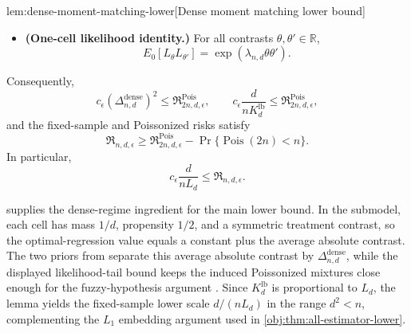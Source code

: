 \begin{lemmav}{lem:dense-moment-matching-lower}[Dense moment matching lower bound]
\begin{itemize}
\[
\int
\left(\Psi\{\operatorname{Obs}(P_\theta^{\mathrm{dense}})\}
-\mathbb E_{\Pi_{j,n,d}}\Psi\{\operatorname{Obs}(P_\theta^{\mathrm{dense}})\}\right)^2
\,d\Pi_{j,n,d}(\theta)
\leq
\frac{a_{n,d}^2}{4d},
\qquad j\in\{0,1\},
\]
and
\[
\Pi_{j,n,d}\left(
\left|\Psi\{\operatorname{Obs}(P_\theta^{\mathrm{dense}})\}
-\mathbb E_{\Pi_{j,n,d}}\Psi\{\operatorname{Obs}(P_\theta^{\mathrm{dense}})\}\right|
>
\frac{\Delta_{n,d}^{\mathrm{dense}}}{4}
\right)
\leq
\frac18,
\qquad j\in\{0,1\}.
\]
\item \textbf{(One-cell likelihood identity.)} For all contrasts \(\theta,\theta'\in\mathbb R\),
\[
E_0[L_\theta L_{\theta'}]
=
\exp(\lambda_{n,d}\theta\theta').
\]
\end{itemize}
Consequently,
\[
c_\epsilon(\Delta_{n,d}^{\mathrm{dense}})^2
\leq
\mathfrak R^{\mathrm{Pois}}_{2n,d,\epsilon},
\qquad
c_\epsilon\frac{d}{nK_d^{\mathrm{lb}}}
\leq
\mathfrak R^{\mathrm{Pois}}_{2n,d,\epsilon},
\]
and the fixed-sample and Poissonized risks satisfy
\[
\mathfrak R_{n,d,\epsilon}
\geq
\mathfrak R^{\mathrm{Pois}}_{2n,d,\epsilon}
-
\Pr\{\operatorname{Pois}(2n)<n\}.
\]
In particular,
\[
c_\epsilon\frac{d}{nL_d}
\leq
\mathfrak R_{n,d,\epsilon}.
\]
\end{lemmav}

 supplies the dense-regime ingredient for the main lower bound. In the submodel, each cell has mass \(1/d\), propensity \(1/2\), and a symmetric treatment contrast, so the optimal-regression value equals a constant plus the average absolute contrast. The two priors from \citet{CaiLow2011L1} separate this average absolute contrast by \(\Delta_{n,d}^{\mathrm{dense}}\), while the displayed likelihood-tail bound keeps the induced Poissonized mixtures close enough for the fuzzy-hypothesis argument \citep{LeCam1986,Tsybakov2009}. Since \(K_d^{\mathrm{lb}}\) is proportional to \(L_d\), the lemma yields the fixed-sample lower scale \(d/(nL_d)\) in the range \(d^2<n\), complementing the \(L_1\) embedding argument used in \cref{obj:thm:all-estimator-lower}.
